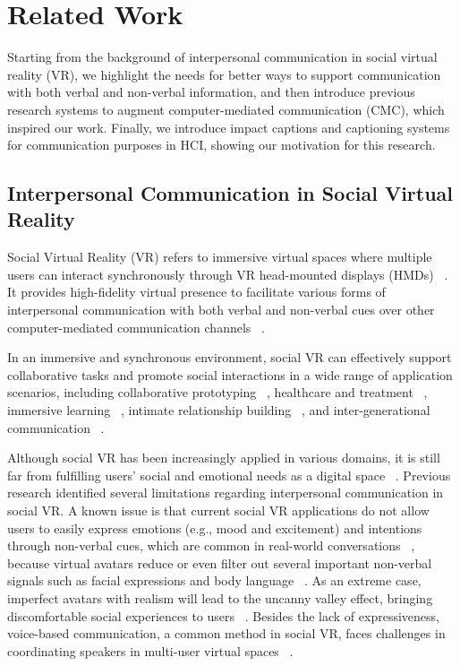 \section{Related Work}
Starting from the background of interpersonal communication in social virtual reality (VR), we highlight the needs for better ways to support communication with both verbal and non-verbal information, and then introduce previous research systems to augment computer-mediated communication (CMC), which inspired our work. Finally, we introduce impact captions and captioning systems for communication purposes in HCI, showing our motivation for this research.

\subsection{Interpersonal Communication in Social Virtual Reality}
Social Virtual Reality (VR) refers to immersive virtual spaces where multiple users can interact synchronously through VR head-mounted displays (HMDs) ~\cite{mcveigh2019shaping, freeman2021body}. It provides high-fidelity virtual presence to facilitate various forms of interpersonal communication with both verbal and non-verbal cues over other computer-mediated communication channels ~\cite{yassien2020design, mcveigh2021case}. 

In an immersive and synchronous environment, social VR can effectively support collaborative tasks and promote social interactions in a wide range of application scenarios, including collaborative prototyping ~\cite{mei2021cakevr}, healthcare and treatment ~\cite{li2020designing, udapola2022social}, immersive learning ~\cite{thanyadit2022xr, peng2021exploring, jensen2018review}, intimate relationship building ~\cite{wang2023designing, freeman2021hugging}, and inter-generational communication ~\cite{shen2024legacysphere, du2024ai, wei2023bridging, baker2019exploring}.

Although social VR has been increasingly applied in various domains, it is still far from fulfilling users’ social and emotional needs as a digital space ~\cite{wei2022communication, tanenbaum2020make, maloney2020talking}. Previous research identified several limitations regarding interpersonal communication in social VR.
A known issue is that current social VR applications do not allow users to easily express emotions (e.g., mood and excitement) and intentions through non-verbal cues, which are common in real-world conversations ~\cite{maloney2020talking, sykownik2023vr, wu2023interactions}, because virtual avatars reduce or even filter out several important non-verbal signals such as facial expressions and body language ~\cite{baker2021avatar, freeman2021body, zhang2022s, lee2022understanding, fu2023mirror}. As an extreme case, imperfect avatars with realism will lead to the uncanny valley effect, bringing discomfortable social experiences to users ~\cite{latoschik2017effect, kyrlitsias2022social}. 
Besides the lack of expressiveness, voice-based communication, a common method in social VR, faces challenges in coordinating speakers in multi-user virtual spaces ~\cite{yan2023conespeech}.

